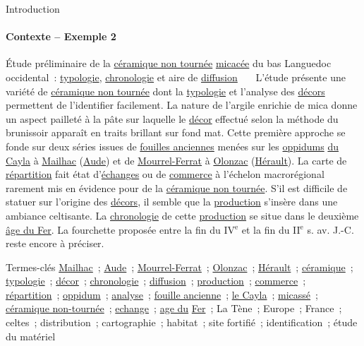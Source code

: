 \begin{frame}{Introduction}\framesubtitle{Contexte -- Exemple 2}
  \vspace{-.33em}
  \begin{exampleblock}{\small
    Étude préliminaire de la \underline{céramique non tournée}
    \underline{micacée} du bas Languedoc occidental~: \underline{typologie},
    \underline{chronologie} et aire de \underline{diffusion}
  }\justifying\small
    ~~~L'étude présente une variété de \underline{céramique non tournée} dont la
    \underline{typologie} et l'analyse des \underline{décors} permettent de
    l'identifier facilement. La nature de l'argile enrichie de mica donne un
    aspect pailleté à la pâte sur laquelle le \underline{décor} effectué selon
    la méthode du brunissoir apparaît en traits brillant sur fond mat. Cette
    première approche se fonde sur deux séries issues de \underline{fouilles
    anciennes} menées sur les \underline{oppidums} \underline{du Cayla} à
    \underline{Mailhac} (\underline{Aude}) et de \underline{Mourrel-Ferrat} à
    \underline{Olonzac} (\underline{Hérault}). La carte de
    \underline{répartition} fait état d'\underline{échanges} ou de
    \underline{commerce} à l'échelon macrorégional rarement mis en évidence pour
    de la \underline{céramique non tournée}. S'il est difficile de statuer sur
    l'origine des \underline{décors}, il semble que la \underline{production}
    s'insère dans une ambiance celtisante. La \underline{chronologie} de cette
    \underline{production} se situe dans le deuxième \underline{âge du Fer}. La
    fourchette proposée entre la fin du IV$^\text{e}$ et la fin du II$^\text{e}$
    s. av. J.-C. reste encore à préciser.

    \begin{exampleblock}{\small Termes-clés}\justifying\small
      \underline{Mailhac}~; \underline{Aude}~; \underline{Mourrel-Ferrat}~;
      \underline{Olonzac}~; \underline{Hérault}~; \underline{céramique}~;
      \underline{typologie}~; \underline{décor}~; \underline{chronologie}~;
      \underline{diffusion}~; \underline{production}~; \underline{commerce}~;
      \underline{répartition}~; \underline{oppidum}~; \underline{analyse}~;
      \underline{fouille ancienne}~; \underline{le Cayla}~;
      \underline{micassé}~; \underline{céramique non-tournée}~;
      \underline{echange}~; \underline{age du} \underline{Fer}~; La Tène~;
      Europe~; France~; celtes~; distribution~; cartographie~; habitat~; site
      fortifié~; identification~; étude du matériel
    \end{exampleblock}
  \end{exampleblock}
\end{frame}

